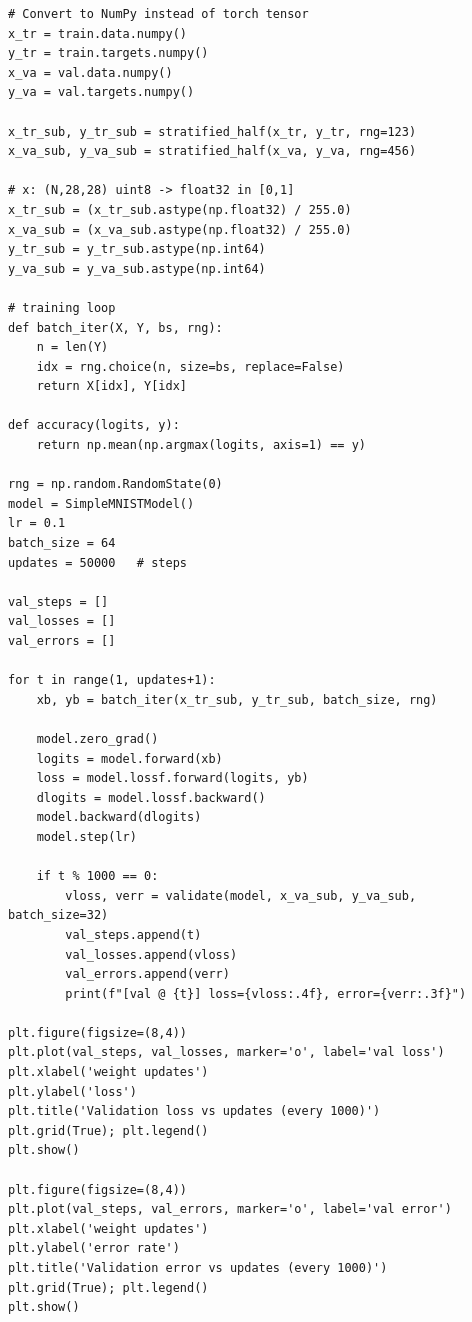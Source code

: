 \documentclass[11pt, reqno, letterpaper, twoside]{amsart}
\theoremstyle{plain}
\theoremstyle{definition}
\begin{document}
\begin{lstlisting}
# Convert to NumPy instead of torch tensor
x_tr = train.data.numpy()      
y_tr = train.targets.numpy()   
x_va = val.data.numpy()        
y_va = val.targets.numpy()

x_tr_sub, y_tr_sub = stratified_half(x_tr, y_tr, rng=123)
x_va_sub, y_va_sub = stratified_half(x_va, y_va, rng=456)

# x: (N,28,28) uint8 -> float32 in [0,1]
x_tr_sub = (x_tr_sub.astype(np.float32) / 255.0)
x_va_sub = (x_va_sub.astype(np.float32) / 255.0)
y_tr_sub = y_tr_sub.astype(np.int64)
y_va_sub = y_va_sub.astype(np.int64)

# training loop
def batch_iter(X, Y, bs, rng):
    n = len(Y)
    idx = rng.choice(n, size=bs, replace=False)
    return X[idx], Y[idx]

def accuracy(logits, y):
    return np.mean(np.argmax(logits, axis=1) == y)

rng = np.random.RandomState(0)
model = SimpleMNISTModel()
lr = 0.1
batch_size = 64
updates = 50000   # steps

val_steps = []
val_losses = []
val_errors = []

for t in range(1, updates+1):
    xb, yb = batch_iter(x_tr_sub, y_tr_sub, batch_size, rng)

    model.zero_grad()
    logits = model.forward(xb)
    loss = model.lossf.forward(logits, yb)
    dlogits = model.lossf.backward()
    model.backward(dlogits)
    model.step(lr)

    if t % 1000 == 0:
        vloss, verr = validate(model, x_va_sub, y_va_sub, batch_size=32)
        val_steps.append(t)
        val_losses.append(vloss)
        val_errors.append(verr)
        print(f"[val @ {t}] loss={vloss:.4f}, error={verr:.3f}")

plt.figure(figsize=(8,4))
plt.plot(val_steps, val_losses, marker='o', label='val loss')
plt.xlabel('weight updates')
plt.ylabel('loss')
plt.title('Validation loss vs updates (every 1000)')
plt.grid(True); plt.legend()
plt.show()

plt.figure(figsize=(8,4))
plt.plot(val_steps, val_errors, marker='o', label='val error')
plt.xlabel('weight updates')
plt.ylabel('error rate')
plt.title('Validation error vs updates (every 1000)')
plt.grid(True); plt.legend()
plt.show()    
\end{lstlisting}
\end{document}
